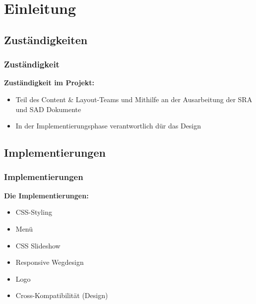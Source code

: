 \section{Einleitung} %
\subsection{Zust\"andigkeiten} %
\begin{frame} %
 \frametitle{Zuständigkeit} %
\textbf{Zuständigkeit im Projekt:} 
 \begin{itemize}
\bigskip

\item Teil des Content \& Layout-Teams und Mithilfe an der Ausarbeitung der SRA und SAD Dokumente
\item In der Implementierungsphase verantwortlich dür das Design


 \end{itemize}

\end{frame}


\subsection{Implementierungen}
\begin{frame} %
\frametitle{Implementierungen} %

\textbf{Die Implementierungen:}
\bigskip

  \begin{itemize}

      \item CSS-Styling
      \item Menü
      \item CSS Slideshow
      \item Responsive Wegdesign
      \item Logo
     \item Cross-Kompatibilität (Design)

  \end{itemize}

\end{frame}
